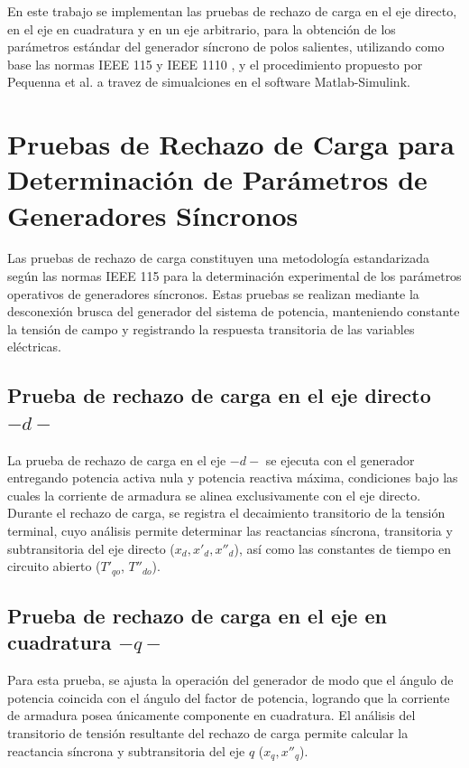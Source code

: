 \documentclass[conference]{IEEEtran}
\begin{document}

En este trabajo se implementan las pruebas de rechazo de carga en el eje directo, en el eje en cuadratura y en un eje arbitrario, para la obtención de los parámetros estándar del generador síncrono de polos salientes, utilizando como base las normas IEEE 115 \cite{IEEE115} y IEEE 1110 \cite{IEEE1110}, y el procedimiento propuesto por Pequenna et al. \cite{pequena,Pequena2010} a travez de simualciones en el software Matlab-Simulink.

\section{Pruebas de Rechazo de Carga para Determinación de Parámetros de Generadores Síncronos} 

Las pruebas de rechazo de carga constituyen una metodología estandarizada según las normas IEEE 115
para la determinación experimental de los parámetros operativos de generadores síncronos. Estas pruebas
se realizan mediante la desconexión brusca del generador del sistema de potencia, manteniendo constante
la tensión de campo y registrando la respuesta transitoria de las variables eléctricas.

\subsection{Prueba de rechazo de carga en el eje directo $-d-$}

La prueba de rechazo de carga en el eje $-d-$ se ejecuta con el generador entregando potencia activa nula y potencia reactiva máxima, condiciones bajo las cuales la corriente de armadura se alinea exclusivamente con el eje directo.
Durante el rechazo de carga, se registra el decaimiento transitorio de la tensión terminal, cuyo análisis
permite determinar las reactancias síncrona, transitoria y subtransitoria del eje directo ($x_d, x'_d, x''_d$), así como las constantes de tiempo en circuito abierto ($T'_{qo}$, $T''_{do}$).

\subsection{Prueba de rechazo de carga en el eje en cuadratura $-q-$}

Para esta prueba, se ajusta la operación del generador de modo que el ángulo de potencia coincida con el ángulo del factor de potencia, logrando que la corriente de armadura posea únicamente componente en cuadratura. El análisis del transitorio de tensión resultante del rechazo de carga permite calcular la reactancia síncrona y subtransitoria del eje $q$ ($x_q, x''_q$).
\end{document}
